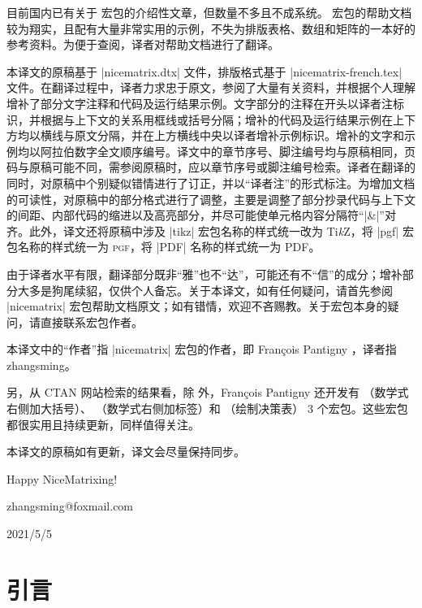 \documentclass[dvipsnames]{article}%
\def\tikzname{Ti\emph{k}Z}
\def\translatedate{2021/5/5}
\begin{document}
目前国内已有关于  宏包的介绍性文章，但数量不多且不成系统。  宏包的帮助文档较为翔实，且配有大量非常实用的示例，不失为排版表格、数组和矩阵的一本好的参考资料。为便于查阅，译者对帮助文档进行了翻译。

本译文的原稿基于 |nicematrix.dtx| 文件，排版格式基于 |nicematrix-french.tex| 文件。在翻译过程中，译者力求忠于原文，参阅了大量有关资料，并根据个人理解增补了部分文字注释和代码及运行结果示例。文字部分的注释在开头以\colorbox{red!30}{译者注}标识，并根据与上下文的关系用框线或括号分隔；增补的代码及运行结果示例在上下方均以横线与原文分隔，并在上方横线中央以\colorbox{red!30}{译者增补示例}标识。增补的文字和示例均以阿拉伯数字全文顺序编号。译文中的章节序号、脚注编号均与原稿相同，页码与原稿可能不同，需参阅原稿时，应以章节序号或脚注编号检索。译者在翻译的同时，对原稿中个别疑似错情进行了订正，并以“译者注”的形式标注。为增加文档的可读性，对原稿中的部分格式进行了调整，主要是调整了部分抄录代码与上下文的间距、内部代码的缩进以及高亮部分，并尽可能使单元格内容分隔符“|&|”对齐。此外，译文还将原稿中涉及 |tikz| 宏包名称的样式统一改为 \tikzname ，将 |pgf| 宏包名称的样式统一为 \textsc{pgf}，将 |PDF| 名称的样式统一为 \textsc{PDF}。

由于译者水平有限，翻译部分既非“雅”也不“达”，可能还有不“信”的成分；增补部分大多是狗尾续貂，仅供个人备忘。关于本译文，如有任何疑问，请首先参阅 |nicematrix| 宏包帮助文档原文；如有错情，欢迎不吝赐教。关于宏包本身的疑问，请直接联系宏包作者。


本译文中的“作者”指 |nicematrix| 宏包的作者，即 François Pantigny ，译者指 zhangsming。

另，从 CTAN 网站检索的结果看，除  外，François Pantigny 还开发有 （数学式右侧加大括号）、 （数学式右侧加标签）和 （绘制决策表） 3 个宏包。这些宏包都很实用且持续更新，同样值得关注。

本译文的原稿如有更新，译文会尽量保持同步。

Happy NiceMatrixing!

\vspace*{2ex}

\hfill zhangsming@foxmail.com\hspace*{5em}

\hfill \translatedate \hspace*{7em}
\clearpage

{}
\section*{引言}
\end{document}
